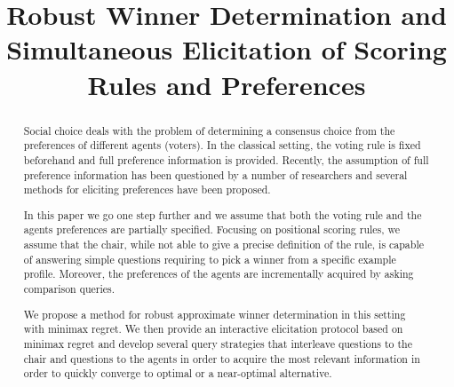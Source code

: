 \newrelation{\pinc}{\!\parallel\!}%

\newcommand{\profile}{\bm{v}}%
\newcommand{\pprofile}{{\bm{p}}}%
\newcommand{\w}{\bm{w}}
\newcommand{\W}{\mathcal{W}}
\newcommand{\Co}{\mathcal{C}}
\newcommand{\pw}{W}%
\newcommand{\powersetz}[1]{\mathscr{P}^*(#1)}

\DeclareMathOperator{\Regret}{Regret}
\DeclareMathOperator{\SCORE}{Score}
\DeclareMathOperator{\PMR}{PMR}
\DeclareMathOperator{\MR}{MR}
\DeclareMathOperator{\MMR}{MMR}
\DeclareMathOperator*{\argmax}{argmax}
\DeclareMathOperator*{\argmin}{argmin}

\newtheorem{claim}{Claim}
\newtheorem{prop}{Proposition}
\newtheorem{corollary}{Corollary}
\newtheorem{definition}{Definition}
\newtheorem{example}{Example}

\DeclarePairedDelimiter\set{\{}{\}}
\DeclarePairedDelimiter\card{\lvert}{\rvert}

	\hfuzz=1cm

\title{Robust Winner Determination and Simultaneous Elicitation of Scoring Rules and Preferences}


\maketitle
\begin{abstract}
Social choice deals with the problem of determining a consensus choice from the preferences of different agents (voters).
In the classical setting, the voting rule is fixed beforehand and full preference information is provided.%
Recently, the assumption of full preference information has been questioned by a number of researchers and several methods for eliciting preferences have been proposed.

In this paper we go one step further and we assume that both the voting rule and the agents preferences are partially specified.
Focusing on positional scoring rules, we assume that the chair, while  not able to give a precise definition of the rule, is capable of answering simple questions  requiring to pick a winner from a specific  example profile.
Moreover, the preferences of the agents are incrementally acquired by asking comparison queries.

We propose a method  for robust approximate winner determination in this setting with minimax regret. 
We then provide an interactive elicitation protocol based on minimax regret
and develop several query strategies that interleave questions to the chair and questions to the agents in order to acquire the most relevant information in order to quickly converge to optimal or a near-optimal alternative.
\end{abstract}

